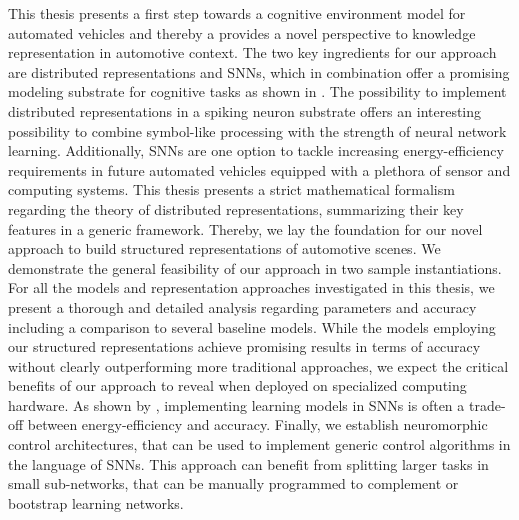This thesis presents a first step towards a cognitive environment model for automated vehicles and thereby a provides a novel perspective to knowledge representation in automotive context.
The two key ingredients for our approach are distributed representations and \acp{SNN}, which in combination offer a promising modeling substrate for cognitive tasks as shown in \citet{Eliasmith2013, Eliasmith2012}. 
The possibility to implement distributed representations in a spiking neuron substrate offers an interesting possibility to combine symbol-like processing with the strength of neural network learning.
Additionally, \acp{SNN} are one option to tackle increasing energy-efficiency requirements in future automated vehicles equipped with a plethora of sensor and computing systems.
This thesis presents a strict mathematical formalism regarding the theory of distributed representations, summarizing their key features in a generic framework.
Thereby, we lay the foundation for our novel approach to build structured representations of automotive scenes.
We demonstrate the general feasibility of our approach in two sample instantiations.
For all the models and representation approaches investigated in this thesis, we present a thorough and detailed analysis regarding parameters and accuracy including a comparison to several baseline models.
While the models employing our structured representations achieve promising results in terms of accuracy without clearly outperforming more traditional approaches, we expect the critical benefits of our approach to reveal when deployed on specialized computing hardware. 
As shown by \citet{Hunsberger2016}, implementing learning models in \acp{SNN} is often a trade-off between energy-efficiency and accuracy.
Finally, we establish neuromorphic control architectures, that can be used to implement generic control algorithms in the language of \acp{SNN}.
This approach can benefit from splitting larger tasks in small sub-networks, that can be manually programmed to complement or bootstrap learning networks.

